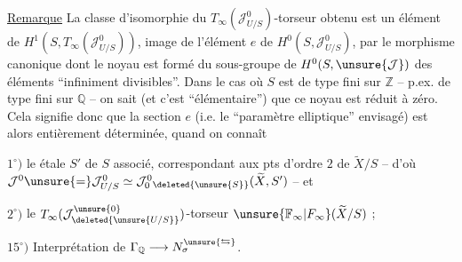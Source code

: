 
\uline{Remarque} La classe d'isomorphie du $T_\infty(\mathcal J^0_{U/S})$-torseur obtenu est un élément de $H^1(S,T_\infty(\mathcal J^0_{U/S}))$, image de l'élément $e$ de $H^0(S,\mathcal J^0_{U/S})$, par le morphisme canonique
dont le noyau est formé du sous-groupe de $H^0(S,\unsure{\mathcal J})$ des éléments ``infiniment divisibles''. Dans le cas où $S$ est  de type fini sur $\mathbb Z$ -- p.ex.  de type fini sur $\mathbb Q$ -- on sait (et c'est  ``élémentaire'') que ce noyau est réduit à zéro. Cela signifie donc que la section $e$  (i.e. le ``paramètre elliptique'' envisagé) est alors entièrement déterminée, quand on connaît


$1^{\circ})$ le   étale $S'$ de $S$ associé, correspondant aux pts d'ordre $2$ de $\widetilde X/S$ -- d'où $\mathcal J^0\unsure{=}\mathcal J^0_{U/S}\simeq\mathcal J^0_0{}_{\deleted{\unsure{S}}}(\widetilde X,S')$ -- et

$2^{\circ})$ le $T_\infty(\mathcal J^{\unsure{0}}_{\deleted{\unsure{U/S}}})$-torseur $\unsure{\mathbb F_\infty|F_\infty}(\widetilde X/S)$ ;


$15^{\circ})$ Interprétation de $\Gamma_{\mathbb Q}\longrightarrow N_\sigma^{\unsure{\leftrightarrows}}$.

